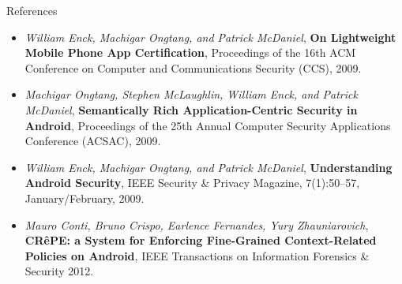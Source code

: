 \begin{frame}{References}

\fontsize{9pt}{0}\selectfont

\begin{itemize}
  \item \textit{William Enck, Machigar Ongtang, and Patrick McDaniel}, 
  \textbf{On Lightweight Mobile Phone App Certification}, Proceedings of the
  16th ACM Conference on Computer and Communications Security (CCS), 2009.

  \vfill

  \item \textit{Machigar Ongtang, Stephen McLaughlin, William Enck, and Patrick
  McDaniel}, \textbf{Semantically Rich Application-Centric Security in Android},
  Proceedings of the 25th Annual Computer Security Applications Conference 
  (ACSAC), 2009.

  \vfill

  \item \textit{William Enck, Machigar Ongtang, and Patrick McDaniel},
  \textbf{Understanding Android Security}, IEEE Security \& Privacy Magazine,
  7(1):50--57, January/February, 2009.

  \vfill

  \item \textit{Mauro Conti, Bruno Crispo, Earlence Fernandes, Yury
  Zhauniarovich}, \textbf{CR\^ePE: a System for Enforcing Fine-Grained
  Context-Related Policies on Android}, IEEE Transactions on Information
  Forensics \& Security 2012.
\end{itemize}

\end{frame}